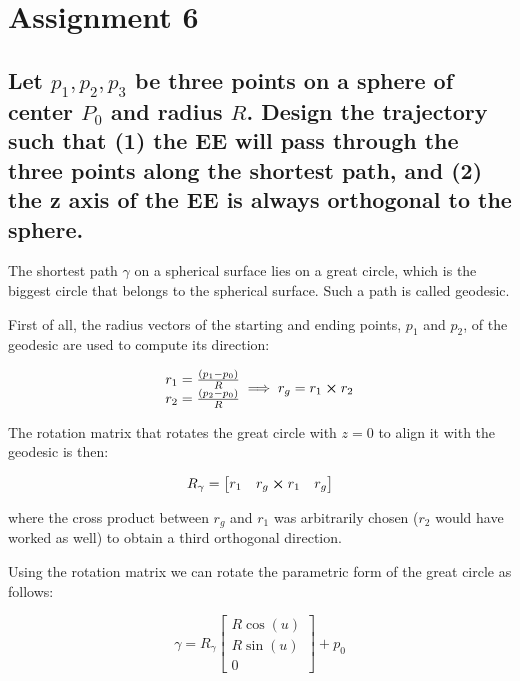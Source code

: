 \section{Assignment 6}

\subsection{Let $p_1 , p_2 , p_3$ be three points on a sphere of center $P_0$ and radius $R$. Design the trajectory such that (1) the EE will pass through the three points along the shortest path, and (2) the z axis of the EE is always orthogonal to the sphere.}

The shortest path $\gamma$ on a spherical surface lies on a great circle, which is the biggest circle that belongs to the spherical surface. Such a path is called geodesic.

First of all, the radius vectors of the starting and ending points, $p_1$ and $p_2$, of the geodesic are used to compute its direction:

\begin{equation*}
\begin{matrix}
r_1 = \frac{(p_1-p_0)}{R}\\
r_2 = \frac{(p_2-p_0)}{R}
\end{matrix}\implies r_g = r_1\cross r_2
\end{equation*}

The rotation matrix that rotates the great circle with $z=0$ to align it with the geodesic is then:

\begin{equation*}
R_\gamma = \begin{bmatrix}
r_1 & r_g\cross r_1 & r_g
\end{bmatrix}
\end{equation*}

where the cross product between $r_g$ and $r_1$ was arbitrarily chosen ($r_2$ would have worked as well) to obtain a third orthogonal direction.

Using the rotation matrix we can rotate the parametric form of the great circle as follows:

\begin{equation*}
\gamma = R_\gamma\begin{bmatrix}
R\cos(u)\\ R\sin(u)\\ 0
\end{bmatrix} + p_0
\end{equation*}

